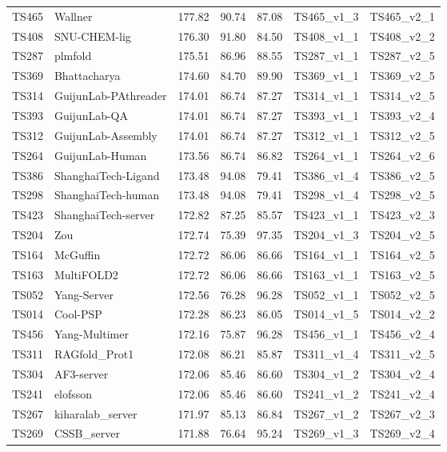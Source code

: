 \begin{longtable}{lllllll}
TS465 & Wallner & 177.82 & 90.74 & 87.08 & TS465\_v1\_3 & TS465\_v2\_1 \\ 
TS408 & SNU-CHEM-lig & 176.30 & 91.80 & 84.50 & TS408\_v1\_1 & TS408\_v2\_2 \\ 
TS287 & plmfold & 175.51 & 86.96 & 88.55 & TS287\_v1\_1 & TS287\_v2\_5 \\ 
TS369 & Bhattacharya & 174.60 & 84.70 & 89.90 & TS369\_v1\_1 & TS369\_v2\_5 \\ 
TS314 & GuijunLab-PAthreader & 174.01 & 86.74 & 87.27 & TS314\_v1\_1 & TS314\_v2\_5 \\ 
TS393 & GuijunLab-QA & 174.01 & 86.74 & 87.27 & TS393\_v1\_1 & TS393\_v2\_4 \\ 
TS312 & GuijunLab-Assembly & 174.01 & 86.74 & 87.27 & TS312\_v1\_1 & TS312\_v2\_5 \\ 
TS264 & GuijunLab-Human & 173.56 & 86.74 & 86.82 & TS264\_v1\_1 & TS264\_v2\_6 \\ 
TS386 & ShanghaiTech-Ligand & 173.48 & 94.08 & 79.41 & TS386\_v1\_4 & TS386\_v2\_5 \\ 
TS298 & ShanghaiTech-human & 173.48 & 94.08 & 79.41 & TS298\_v1\_4 & TS298\_v2\_5 \\ 
TS423 & ShanghaiTech-server & 172.82 & 87.25 & 85.57 & TS423\_v1\_1 & TS423\_v2\_3 \\ 
TS204 & Zou & 172.74 & 75.39 & 97.35 & TS204\_v1\_3 & TS204\_v2\_5 \\ 
TS164 & McGuffin & 172.72 & 86.06 & 86.66 & TS164\_v1\_1 & TS164\_v2\_5 \\ 
TS163 & MultiFOLD2 & 172.72 & 86.06 & 86.66 & TS163\_v1\_1 & TS163\_v2\_5 \\ 
TS052 & Yang-Server & 172.56 & 76.28 & 96.28 & TS052\_v1\_1 & TS052\_v2\_5 \\ 
TS014 & Cool-PSP & 172.28 & 86.23 & 86.05 & TS014\_v1\_5 & TS014\_v2\_2 \\ 
TS456 & Yang-Multimer & 172.16 & 75.87 & 96.28 & TS456\_v1\_1 & TS456\_v2\_4 \\ 
TS311 & RAGfold\_Prot1 & 172.08 & 86.21 & 85.87 & TS311\_v1\_4 & TS311\_v2\_5 \\ 
TS304 & AF3-server & 172.06 & 85.46 & 86.60 & TS304\_v1\_2 & TS304\_v2\_4 \\ 
TS241 & elofsson & 172.06 & 85.46 & 86.60 & TS241\_v1\_2 & TS241\_v2\_4 \\ 
TS267 & kiharalab\_server & 171.97 & 85.13 & 86.84 & TS267\_v1\_2 & TS267\_v2\_3 \\ 
TS269 & CSSB\_server & 171.88 & 76.64 & 95.24 & TS269\_v1\_3 & TS269\_v2\_4 \\ 

\end{longtable}
